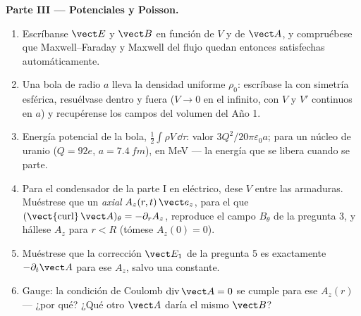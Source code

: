 \begin{problem}
\medskip
\noindent\textbf{Parte III --- Potenciales y Poisson.}
\begin{enumerate}[resume]
  \item Escríbanse $\vect E$ y $\vect B$ en función de $V$ y de $\vect A$, y
        compruébese que Maxwell--Faraday y Maxwell del flujo quedan
        entonces satisfechas automáticamente.
  \item Una bola de radio $a$ lleva la densidad uniforme $\rho_0$: escríbase
        la  con simetría esférica, resuélvase dentro y
        fuera ($V \to 0$ en el infinito, con $V$ y $V'$ continuos en $a$) y
        recupérense los campos del volumen del Año 1.
  \item Energía potencial de la bola, $\tfrac12\int\rho V\,\dd\tau$: valor
        $3Q^2/20\pi\varepsilon_0a$; para un núcleo de uranio ($Q = 92e$, $a =
        \qty{7.4}{fm}$), en MeV --- la energía que se libera cuando se parte.
  \item Para el condensador de la parte I en 
        eléctrico, dese $V$ entre las armaduras. Muéstrese que un  \emph{axial} $A_z(r, t)\,\vect e_z$, para el que $(\operatorname{\vect{curl}}
        \vect A)_\theta = -\partial_rA_z$, reproduce el campo $B_\theta$ de la
        pregunta 3, y hállese $A_z$ para $r < R$ (tómese $A_z(0) = 0$).
  \item Muéstrese que la corrección $\vect E_1$ de la pregunta 5 es
        exactamente $-\partial_t\vect A$ para ese $A_z$, salvo una constante.
  \item Gauge: la condición de Coulomb $\operatorname{div}\vect A = 0$ se
        cumple para ese $A_z(r)$ --- ¿por qué? ¿Qué otro $\vect A$ daría el
        mismo $\vect B$?
\end{enumerate}


\end{problem}
